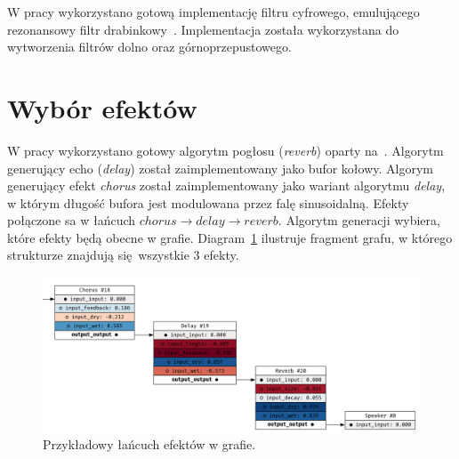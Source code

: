 W pracy wykorzystano gotową implementację filtru cyfrowego, emulującego
rezonansowy filtr drabinkowy~\cite{ladder_filter_rust}.
Implementacja została wykorzystana do wytworzenia filtrów dolno oraz górnoprzepustowego.

\section{Wybór efektów}

W pracy wykorzystano gotowy algorytm pogłosu (\textit{reverb}) oparty na~\cite{reverb}.
Algorytm generujący echo (\textit{delay}) został zaimplementowany jako bufor kołowy.
Algorym generujący efekt \textit{chorus} został zaimplementowany jako wariant algorytmu \textit{delay},
w którym długość bufora jest modulowana przez falę sinusoidalną. Efekty połączone sa w łańcuch
$chorus \rightarrow delay \rightarrow reverb$. Algorytm generacji wybiera, które efekty będą obecne w grafie.
Diagram~\ref{fig:example_generated_effects} ilustruje fragment grafu,
w którego strukturze znajdują się wszystkie 3 efekty.

\begin{figure}[H]
    \centering
    \includegraphics[width=1.0\linewidth]{rys06/example_generated_effects.png}
    \caption{
      Przykładowy łańcuch efektów w grafie.
    }\label{fig:example_generated_effects}
\end{figure}
